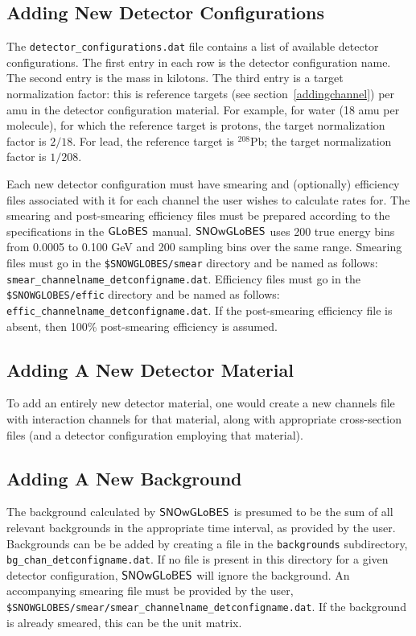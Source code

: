 \documentclass[12pt]{article}
\newcommand{\globes}{\sf{GLoBES}}
\newcommand{\snowglobes}{\sf{SNOwGLoBES}}
\begin{document}
\subsection{Adding New Detector Configurations}

The \texttt{detector\_configurations.dat} file contains a list of
available detector configurations.  The first entry in each row is the
detector configuration name.  The second entry is the mass in
kilotons.  The third entry is a target normalization factor: this is
reference targets (see section~\ref{addingchannel}) per
amu in the detector configuration material.  For example,
for water (18 amu per molecule), for which the reference target is protons, the target
normalization factor is $2/18$.  For lead, the reference target is
$^{208}$Pb; the target normalization factor is $1/208$.

Each new detector configuration must have smearing and
(optionally) efficiency files associated with it for each channel the
user wishes to calculate rates for.  The smearing and post-smearing
efficiency files must be prepared according to the specifications in
the $\globes$ manual.  $\snowglobes$ uses 200 true energy bins from 0.0005 to 0.100 GeV and 200 sampling bins over the same range. 
Smearing files must go in the
\texttt{\$SNOWGLOBES/smear} directory and be named as follows:
\texttt{smear\_channelname\_detconfigname.dat}.  Efficiency files must
go in the \texttt{\$SNOWGLOBES/effic} directory and be named as
follows: \texttt{effic\_channelname\_detconfigname.dat}.
If the post-smearing efficiency file is absent, then 100\% post-smearing efficiency is assumed.

\subsection{Adding A New Detector Material}

To add an entirely new detector material, one would create a new
channels file with interaction channels for that material, along with
appropriate cross-section files (and a detector
configuration employing that material).

\subsection{Adding A New Background}

The background calculated by $\snowglobes$ is presumed to be the sum of all relevant backgrounds in the appropriate time interval, as provided by the user.  Backgrounds can be 
be added by creating a file in the \texttt{backgrounds} subdirectory,
\texttt{bg\_chan\_detconfigname.dat}.
If no file is present in this directory for a given detector configuration, $\snowglobes$ will ignore the background.
An accompanying smearing file must be provided by the user,\\
\texttt{\$SNOWGLOBES/smear/smear\_channelname\_detconfigname.dat}.  
If the background is already smeared, this can be the unit matrix.
\end{document}
